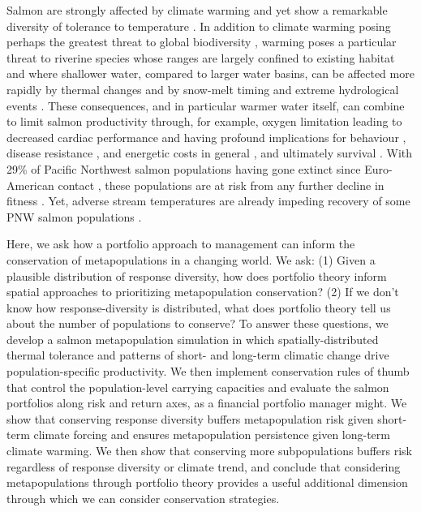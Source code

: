 Salmon are strongly affected by climate warming and yet show a remarkable diversity of tolerance to temperature \citep{beacham1989, crozier2006, battin2007, crozier2008}. In addition to climate warming posing perhaps the greatest threat to global biodiversity \citep{thomas2004}, warming poses a particular threat to riverine species whose ranges are largely confined to existing habitat \citep{thomas2010} and where shallower water, compared to larger water basins, can be affected more rapidly by thermal changes \citep{isaak2010} and by snow-melt timing and extreme hydrological events \citep{crozier2008}. These consequences, and in particular warmer water itself, can combine to limit salmon productivity through, for example, oxygen limitation \citep{portner2007} leading to decreased cardiac performance \citep{eliason2011} and having profound implications for behaviour \citep{goniea2006}, disease resistance \citep{crozier2008}, and energetic costs in general \citep{rand1998}, and ultimately survival \citep{peterman1998, eliason2011}. With 29\% of Pacific Northwest salmon populations having gone extinct since Euro-American contact \citep{gustafson2007}, these populations are at risk from any further decline in fitness \citep{mcclure2003}. Yet, adverse stream temperatures are already impeding recovery of some PNW salmon populations \citep{mccullough1999}.

Here, we ask how a portfolio approach to management can inform the conservation of metapopulations in a changing world. We ask: (1) Given a plausible distribution of response diversity, how does portfolio theory inform spatial approaches to prioritizing metapopulation conservation? (2) If we don't know how response-diversity is distributed, what does portfolio theory tell us about the number of populations to conserve? To answer these questions, we develop a salmon metapopulation simulation in which spatially-distributed thermal tolerance and patterns of short- and long-term climatic change drive population-specific productivity. We then implement conservation rules of thumb that control the population-level carrying capacities and evaluate the salmon portfolios along risk and return axes, as a financial portfolio manager might. We show that conserving response diversity buffers metapopulation risk given short-term climate forcing and ensures metapopulation persistence given long-term climate warming. We then show that conserving more subpopulations buffers risk regardless of response diversity or climate trend, and conclude that considering metapopulations through portfolio theory provides a useful additional dimension through which we can consider conservation strategies.

